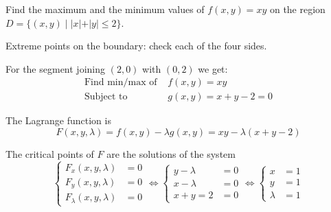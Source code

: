 \begin{frame}
  Find the maximum and the minimum values of $f(x,y) = xy$ on the region $D = \{ (x,y) \; | \; |x|+|y| \leqslant 2 \}$.

  Extreme points on the boundary: check each of the four sides.

  For the segment joining $(2,0)$ with $(0,2)$ we get:
%
\begin{align*}
  \text{Find min/max of } & f(x,y) = xy \\
  \text{Subject to } & g(x,y) = x+y-2 =0
\end{align*}


\pause
The Lagrange function is
%
$$F(x,y,\lambda) = f(x,y) - \lambda g(x,y) = xy - \lambda(x+y-2)$$

\pause
The critical points of $F$ are the solutions of the system
%
$$\left\{
\begin{array}{ll}
  F_x(x,y,\lambda) & = 0 \\
  F_y(x,y,\lambda) & =0\\
  F_\lambda(x,y,\lambda) & =0
\end{array}
\right. \Longleftrightarrow
\left\{
\begin{array}{ll}
  y-\lambda & = 0 \\
  x-\lambda & =0\\
  x+y=2 & =0
\end{array}
\right. \Longleftrightarrow
\left\{
\begin{array}{ll}
  x & = 1 \\
  y & = 1\\
  \lambda & =1
\end{array}
\right.
 $$
\end{frame}

